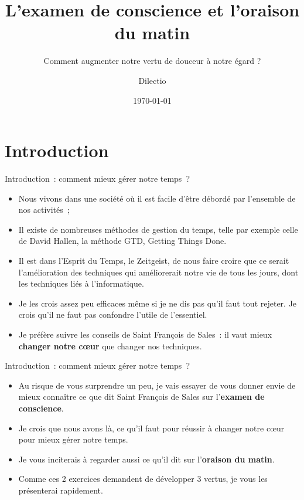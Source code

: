 \documentclass[11pt,xcolor=dvipsname,ignorenonframetext,handout]{beamer}
\title{L'examen de conscience et l'oraison du matin}
\subtitle{Comment augmenter notre vertu de douceur à notre égard ?}
\author{Dilectio}
\institute{}
\date{\today}
\begin{document}
\begin{frame}
  \titlepage
\end{frame}

\section{Introduction}
\begin{frame}{Introduction~: comment mieux gérer notre temps~?}
    \begin{itemize}
        \rightskip=0pt\leftskip=0pt
        \item Nous vivons dans une société où il est facile d'être débordé par l'ensemble de nos activités~;
        \item Il existe de nombreuses méthodes de gestion du temps, telle par exemple celle de David Hallen, la méthode GTD, Getting Things Done.
        \item Il est dans l'Esprit du Temps, le Zeitgeist, de nous faire croire que ce serait l'amélioration des techniques qui améliorerait notre vie de tous les jours, dont les techniques liés à l'informatique.
        \item Je les crois assez peu efficaces même si je ne dis pas qu'il faut tout rejeter. Je crois qu'il ne faut pas confondre l'utile de l'essentiel.
        \item Je préfère suivre les conseils de Saint François de Sales~: il vaut mieux \textbf{changer notre cœur} que changer nos techniques.
    \end{itemize}  
\begin{frame}{Introduction~: comment mieux gérer notre temps~?}
    \begin{itemize}
        \rightskip=0pt\leftskip=0pt
        \item Au risque de vous surprendre un peu, je vais essayer de vous donner envie de mieux connaître ce que dit Saint François de Sales sur l'\textbf{examen de conscience}.
        \item Je crois que nous avons là, ce qu'il faut pour réussir à changer notre cœur pour mieux gérer notre temps.
        \item Je vous inciterais à regarder aussi ce qu'il dit sur l'\textbf{oraison du matin}.
        \item Comme ces 2 exercices demandent de développer 3 vertus, je vous les présenterai rapidement.

\end{itemize}
\end{frame}
\end{frame}
\end{document}

